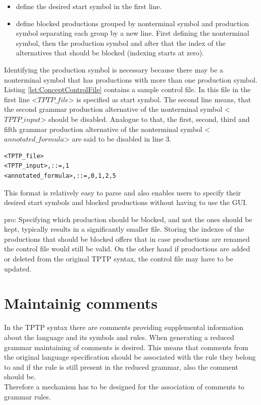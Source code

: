 \begin{itemize}%
	\item define the desired start symbol in the first line.
	\item define blocked productions grouped by nonterminal symbol and production symbol separating each group by a new line.
	First defining the nonterminal symbol, then the production symbol and after that the index of the alternatives that should be blocked (indexing starts at zero). 
\end{itemize}

Identifying the production symbol is necessary because there may be a nonterminal symbol that has productions with more than one production symbol.\\
Listing \ref{lst:ConceptControlFile} contains a sample control file. In this file in the first line <$TPTP\_file$> is specified as start symbol.
The second line means, that the second grammar production alternative of the nonterminal symbol <$TPTP\_input$> should be disabled.
Analogue to that, the first, second, third and fifth grammar production alternative of the nonterminal symbol <$annotated\_formula$> are said to be disabled in line 3.

\begin{lstlisting}[caption= Example of a control file,label= lst:ConceptControlFile]
<TPTP_file>
<TPTP_input>,::=,1
<annotated_formula>,::=,0,1,2,5
\end{lstlisting}
This format is relatively easy to parse and also enables users to specify their desired start symbols and blocked productions without having to use the GUI.

pro: Specifying which production should be blocked, and not the ones should be kept, typically results in a significantly smaller file.
Storing the indexes of the productions that should be blocked offers that in case productions are renamed the control file would still be valid. On the other hand if productions are added or deleted from the original \ac{TPTP} syntax, the control file may have to be updated.

\section{Maintainig comments}\label{sec:ConceptMaintainingComments}
In the \ac{TPTP} syntax there are comments providing supplemental information about the language and its symbols and rules.
When generating a reduced grammar maintaining of comments is desired. This means that comments from the original language specification should be associated with the rule they belong to and if the rule is still present in the reduced grammar, also the comment should be.\\
Therefore a mechanism has to be designed for the association of comments to grammar rules.


